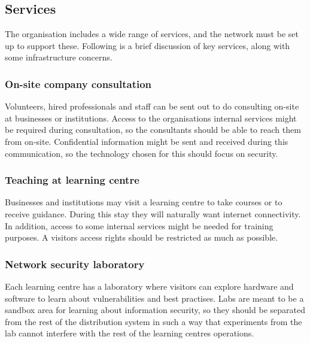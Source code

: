 \subsection{Services}

The organisation includes a wide range of services, and the network must be set up to support these. Following is a brief discussion of key services, along with some infrastructure concerns.


\subsubsection{On-site company consultation}

Volunteers, hired professionals and staff  can be sent out to do consulting on-site at businesses or institutions. Access to the organisations internal services might be required during consultation, so the consultants should be able to reach them from on-site. Confidential information might be sent and received during this communication, so the technology chosen for this should focus on security.

\subsubsection{Teaching at learning centre}

Businesses and institutions may visit a learning centre to take courses or to receive guidance. During this stay they will naturally want internet connectivity. In addition, access to some internal services might be needed for training purposes. A visitors access rights should be restricted as much as possible.

\subsubsection{Network security laboratory}

Each learning centre has a laboratory where visitors can explore hardware and software to learn about vulnerabilities and best practises. Labs are meant to be a sandbox area for learning about information security, so they should be separated from the rest of the distribution system in such a way that experiments from the lab cannot interfere with the rest of the learning centres operations.


